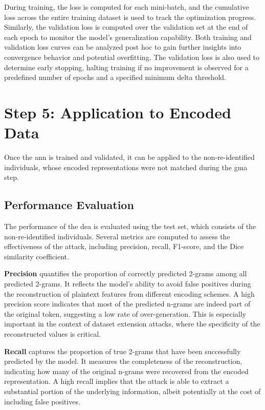 During training, the loss is computed for each mini-batch, and the cumulative loss across the entire training dataset is used to track the optimization progress.
Similarly, the validation loss is computed over the validation set at the end of each epoch to monitor the model's generalization capability.
Both training and validation loss curves can be analyzed post hoc to gain further insights into convergence behavior and potential overfitting.
The validation loss is also used to determine early stopping, halting training if no improvement is observed for a predefined number of epochs and a specified minimum delta threshold.

\section{Step 5: Application to Encoded Data} \label{sec:application}

Once the \ac{ann} is trained and validated, it can be applied to the non-re-identified individuals, whose encoded representations were not matched during the \ac{gma} step.

\subsection{Performance Evaluation}

The performance of the \ac{dea} is evaluated using the test set, which consists of the non-re-identified individuals.
Several metrics are computed to assess the effectiveness of the attack, including precision, recall, F1-score, and the Dice similarity coefficient.

\textbf{Precision} quantifies the proportion of correctly predicted 2-grams among all predicted 2-grams.
It reflects the model's ability to avoid false positives during the reconstruction of plaintext features from different encoding schemes.
A high precision score indicates that most of the predicted n-grams are indeed part of the original token, suggesting a low rate of over-generation.
This is especially important in the context of dataset extension attacks, where the specificity of the reconstructed values is critical.

\textbf{Recall} captures the proportion of true 2-grams that have been successfully predicted by the model.
It measures the completeness of the reconstruction, indicating how many of the original n-grams were recovered from the encoded representation.
A high recall implies that the attack is able to extract a substantial portion of the underlying information, albeit potentially at the cost of including false positives.

